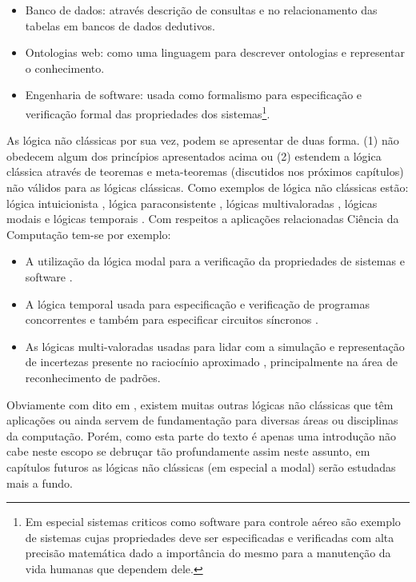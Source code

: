 \begin{itemize}
	\item Banco de dados: através descrição de consultas e no relacionamento das
tabelas em bancos de dados dedutivos.
	\item Ontologias web: como uma linguagem para descrever
ontologias e representar o conhecimento.
	\item Engenharia de software: usada como formalismo para especificação e verificação formal das propriedades dos sistemas\footnote{Em especial sistemas criticos como software para controle aéreo são exemplo de sistemas cujas propriedades deve ser especificadas e verificadas com alta precisão matemática dado a importância do mesmo para a manutenção da vida humanas que dependem dele.}.
\end{itemize}

As lógica não clássicas por sua vez, podem se apresentar de duas forma. (1) não obedecem algum dos princípios apresentados acima ou (2) estendem a lógica clássica através de teoremas e meta-teoremas (discutidos nos próximos capítulos) não válidos para as lógicas clássicas. Como exemplos de lógica não clássicas estão: lógica intuicionista \cite{lungarzo1972}, lógica paraconsistente \cite{da2008logica}, lógicas multivaloradas \cite{BenjaV1, magnus2020}, lógicas modais \cite{magnus2020} e lógicas temporais \cite{halpern1983, harel1979, manna1979}. Com respeitos a aplicações relacionadas Ciência da Computação tem-se por exemplo:

\begin{itemize}
	\item A utilização da lógica modal para a verificação da propriedades de sistemas e software \cite{harel1979}.
	\item A lógica temporal usada para especificação e verificação de programas
concorrentes \cite{manna1979} e também para especificar circuitos síncronos \cite{halpern1983}.
	\item As lógicas multi-valoradas usadas para lidar com a simulação e representação de
incertezas presente no raciocínio aproximado \cite{BenjaV1}, principalmente na área de reconhecimento de padrões.
\end{itemize}

Obviamente com dito em \cite{BenjaV1}, existem muitas outras lógicas não clássicas que têm aplicações ou ainda servem de fundamentação para diversas áreas ou disciplinas da computação. Porém, como esta parte do texto é apenas uma introdução não cabe neste escopo se debruçar tão profundamente assim neste assunto, em capítulos futuros as lógicas não clássicas (em especial a modal) serão estudadas mais a fundo. 

